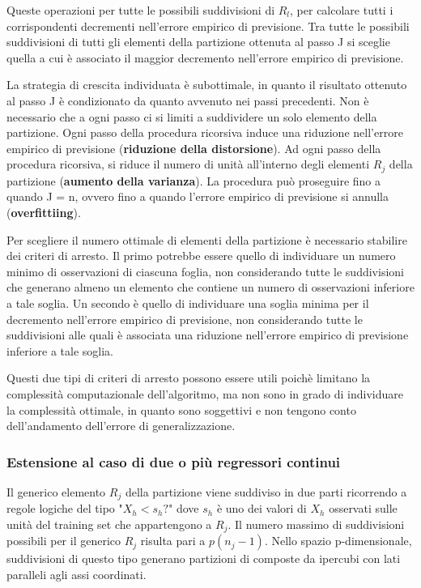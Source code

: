 \documentclass[a4paper]{extarticle}
\begin{document}
Queste operazioni per tutte le possibili suddivisioni di $R_l$, per calcolare tutti i corrispondenti decrementi nell'errore empirico di previsione. Tra tutte le possibili suddivisioni di tutti gli elementi della partizione ottenuta al passo J si sceglie quella a cui è associato il maggior decremento nell'errore empirico di previsione.

La strategia di crescita individuata è subottimale, in quanto il risultato ottenuto al passo J è condizionato da quanto avvenuto nei passi precedenti. Non è necessario che a ogni passo ci si limiti a suddividere un solo elemento della partizione. Ogni passo della procedura ricorsiva induce una riduzione nell'errore empirico di previsione (\textbf{riduzione della distorsione}). Ad ogni passo della procedura ricorsiva, si riduce il numero di unità all'interno degli elementi $R_j$ della partizione (\textbf{aumento della varianza}). La procedura può proseguire fino a quando J = n, ovvero fino a quando l'errore empirico di previsione si annulla (\textbf{overfittiing}).

Per scegliere il numero ottimale di elementi della partizione è necessario stabilire dei criteri di arresto. Il primo potrebbe essere quello di individuare un numero minimo di osservazioni di ciascuna foglia, non considerando tutte le suddivisioni che generano almeno un elemento che contiene un numero di osservazioni inferiore a tale soglia. Un secondo è quello di individuare una soglia minima per il decremento nell'errore empirico di previsione, non considerando tutte le suddivisioni alle quali è associata una riduzione nell'errore empirico di previsione inferiore a tale soglia.

Questi due tipi di criteri di arresto possono essere utili poichè limitano la complessità computazionale dell'algoritmo, ma non sono in grado di individuare la complessità ottimale, in quanto sono soggettivi e non tengono conto dell'andamento dell'errore di generalizzazione.

\subsubsection{Estensione al caso di due o più regressori continui}

Il generico elemento $R_j$ della partizione viene suddiviso in due parti ricorrendo a regole logiche del tipo "$X_h<s_h?$" dove $s_h$ è uno dei valori di $X_h$ osservati sulle unità del training set che appartengono a $R_j$. Il numero massimo di suddivisioni possibili per il generico $R_j$ risulta pari a $p(n_j-1)$. Nello spazio p-dimensionale, suddivisioni di questo tipo generano partizioni di composte da ipercubi con lati paralleli agli assi coordinati. 
\end{document}
